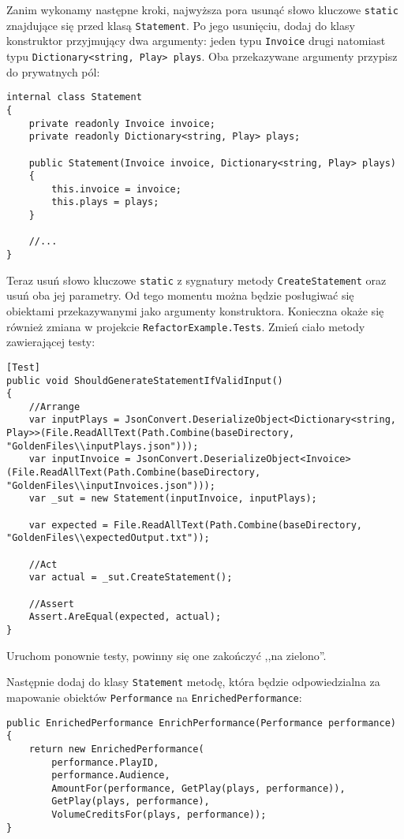 Zanim wykonamy następne kroki, najwyższa pora usunąć słowo kluczowe \texttt{static} znajdujące się przed klasą \texttt{Statement}. Po jego usunięciu, dodaj do klasy konstruktor przyjmujący dwa argumenty: jeden typu \texttt{Invoice} drugi natomiast typu \texttt{Dictionary<string, Play> plays}. Oba przekazywane argumenty przypisz do prywatnych pól:
\begin{lstlisting}
internal class Statement
{
	private readonly Invoice invoice;
	private readonly Dictionary<string, Play> plays;
	
	public Statement(Invoice invoice, Dictionary<string, Play> plays)
	{
		this.invoice = invoice;
		this.plays = plays;
	}

	//...
}
\end{lstlisting}

Teraz usuń słowo kluczowe \texttt{static} z sygnatury metody \texttt{CreateStatement} oraz usuń oba jej parametry. Od tego momentu można będzie posługiwać się obiektami przekazywanymi jako argumenty konstruktora. Konieczna okaże się również zmiana w projekcie \texttt{RefactorExample.Tests}. Zmień ciało metody zawierającej testy:
\begin{lstlisting}
[Test]
public void ShouldGenerateStatementIfValidInput()
{
	//Arrange
	var inputPlays = JsonConvert.DeserializeObject<Dictionary<string, Play>>(File.ReadAllText(Path.Combine(baseDirectory, "GoldenFiles\\inputPlays.json")));
	var inputInvoice = JsonConvert.DeserializeObject<Invoice>(File.ReadAllText(Path.Combine(baseDirectory, "GoldenFiles\\inputInvoices.json")));
	var _sut = new Statement(inputInvoice, inputPlays);
	
	var expected = File.ReadAllText(Path.Combine(baseDirectory, "GoldenFiles\\expectedOutput.txt"));
	
	//Act
	var actual = _sut.CreateStatement();
	
	//Assert
	Assert.AreEqual(expected, actual);
}
\end{lstlisting}
Uruchom ponownie testy, powinny się one zakończyć ,,na zielono''.


Następnie dodaj do klasy \texttt{Statement} metodę, która będzie odpowiedzialna za mapowanie obiektów \texttt{Performance} na \texttt{EnrichedPerformance}:
\begin{lstlisting}
public EnrichedPerformance EnrichPerformance(Performance performance)
{
	return new EnrichedPerformance(
		performance.PlayID,
		performance.Audience,
		AmountFor(performance, GetPlay(plays, performance)),
		GetPlay(plays, performance),
		VolumeCreditsFor(plays, performance));
}
\end{lstlisting}



